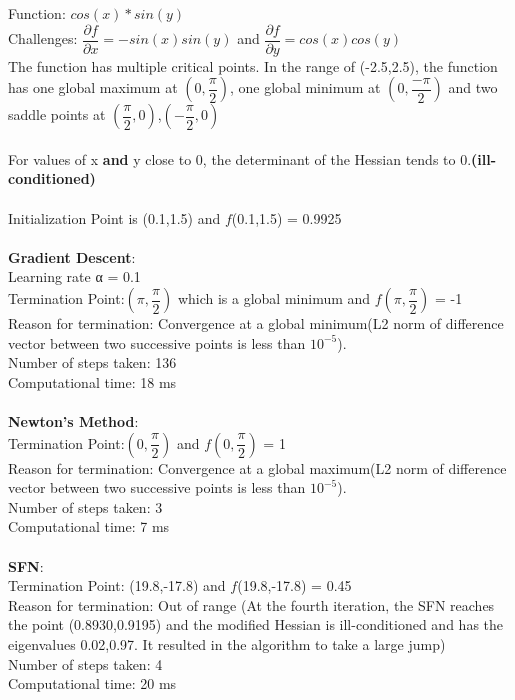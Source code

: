 
\newpage

Function: $cos(x)*sin(y)$
\\Challenges: $\dfrac{\partial f}{\partial x} = -sin(x)sin(y)$ and $\dfrac{\partial f}{\partial y} = cos(x)cos(y)$
\\The function has multiple critical points. In the range of (-2.5,2.5), the function has one global maximum at $(0,\dfrac{\pi}{2})$, one global minimum at $(0,\dfrac{-\pi}{2})$ and two saddle points at $(\dfrac{\pi}{2},0)$,$(-\dfrac{\pi}{2},0)$
\\\\For values of x \textbf{and} y close to 0, the determinant of the Hessian tends to 0.\textbf{(ill-conditioned)}
\\\\Initialization Point is (0.1,1.5) and $f$(0.1,1.5) = 0.9925
\\\\
\textbf{Gradient Descent}: 
\\Learning rate α = 0.1
\\Termination Point:$(\pi,\dfrac{\pi}{2})$ which is a global minimum and $f(\pi, \dfrac{\pi}{2})$ = -1
\\Reason for termination: Convergence at a global minimum(L2 norm of difference vector between two successive points is less than $10^{-5}$).
\\Number of steps taken: 136
\\Computational time: 18 ms
\\\\
\textbf{Newton’s Method}: 
\\Termination Point:$(0, \dfrac{\pi}{2})$ and $f(0, \dfrac{\pi}{2})$ = 1
\\Reason for termination: Convergence at a global maximum(L2 norm of difference vector between two successive points is less than $10^{-5}$).
\\Number of steps taken: 3
\\Computational time: 7 ms
\\\\
\textbf{SFN}: 
\\Termination Point: (19.8,-17.8) and $f$(19.8,-17.8) = 0.45
\\Reason for termination: Out of range (At the fourth iteration, the SFN reaches the point (0.8930,0.9195) and the modified Hessian is ill-conditioned and has the eigenvalues 0.02,0.97. It resulted in the algorithm to take a large jump)
\\Number of steps taken: 4
\\Computational time: 20 ms

